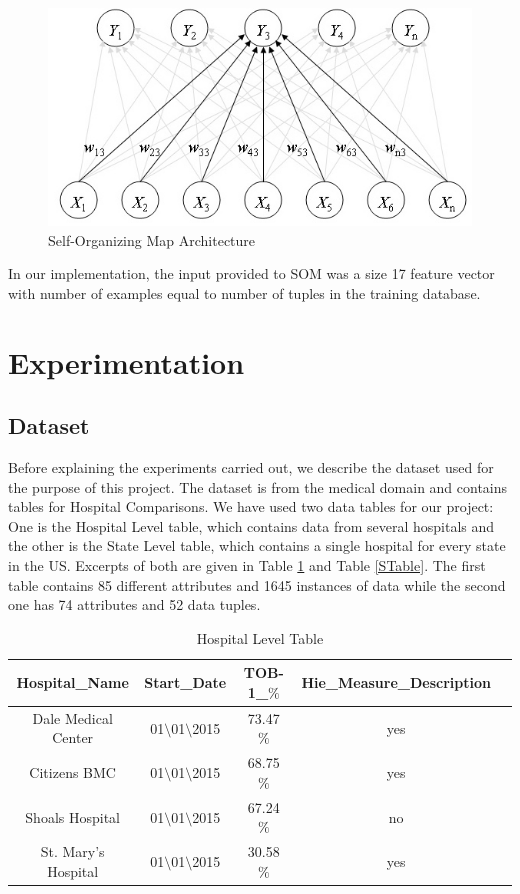 \documentclass[conference]{IEEEtran}
\begin{document}
\begin{figure}[h]
\centering
\includegraphics[scale=0.4]{1.jpeg}
\caption{Self-Organizing Map Architecture}
\label{SOM}
\end{figure}

In our implementation, the input provided to SOM was a size 17 feature vector with number of examples equal to number of tuples in the training database. 

\section{Experimentation}
\subsection{Dataset}
Before explaining the experiments carried out, we describe the dataset used for the purpose of this project. The dataset is from the medical domain and contains tables for Hospital Comparisons. We have used two data tables for our project: One is the Hospital Level table, which contains data from several hospitals and the other is the State Level table, which contains a single hospital for every state in the US. Excerpts of both are given in Table \ref{HTable} and Table \ref{STable}. The first table contains 85 different attributes and 1645 instances of data while the second one has 74 attributes and 52 data tuples. 

\begin{table}[h]
\centering
\caption{Hospital Level Table}
\begin{tabular}{|c|c|c|c|c|}
\hline
Hospital\_Name & Start\_Date & TOB-1\_$\%$ & Hie\_Measure\_Description\\
\hline \hline
Dale Medical Center & 01$\setminus$01$\setminus$2015 & 73.47 $\%$ & yes\\
\hline
Citizens BMC & 01$\setminus$01$\setminus$2015 & 68.75 $\%$ & yes\\
\hline
Shoals Hospital & 01$\setminus$01$\setminus$2015 & 67.24 $\%$ & no\\
\hline
St. Mary's Hospital  & 01$\setminus$01$\setminus$2015 & 30.58 $\%$ & yes\\
\hline
\end{tabular}
\label{HTable}
\end{table}
\end{document}
